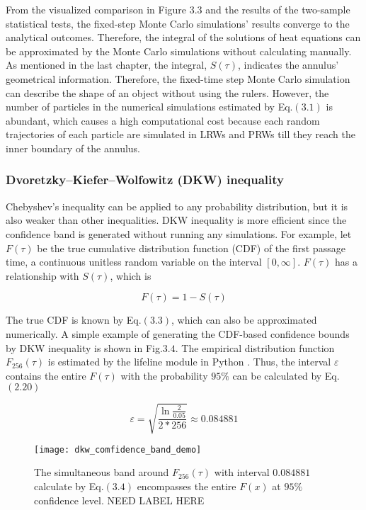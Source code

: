 From the visualized comparison in Figure $3.3$ and the results of the
two-sample statistical tests, the fixed-step Monte Carlo simulations'
results converge to the analytical outcomes. Therefore, the integral
of the solutions of heat equations can be approximated by the Monte
Carlo simulations without calculating manually. As mentioned in the
last chapter, the integral, $S(\tau)$, indicates the annulus'
geometrical information. Therefore, the fixed-time step Monte Carlo
simulation can describe the shape of an object without using the
rulers. However, the number of particles in the numerical simulations
estimated by Eq.$(3.1)$ is abundant, which causes a high computational
cost because each random trajectories of each particle are simulated
in LRWs and PRWs till they reach the inner boundary of the annulus. 


\subsubsection{Dvoretzky–Kiefer–Wolfowitz (DKW) inequality}

Chebyshev's inequality can be applied to any probability distribution,
but it is also weaker than other inequalities. DKW inequality is more
efficient since the confidence band is generated without running any
simulations. For example, let $F(\tau)$ be the true cumulative
distribution function (CDF) of the first passage time, a continuous unitless
random variable on the interval $[0, \infty]$. $F(\tau)$ has a
relationship with $S(\tau)$, which is

\begin{equation}
  F(\tau) = 1 - S(\tau)
\end{equation}

The true CDF is known by Eq.$(3.3)$, which can also be approximated
numerically. A simple example of generating the CDF-based confidence
bounds by DKW inequality is shown in Fig.$3.4$. The empirical
distribution function $F_{256}(\tau)$ is estimated by the lifeline
module in Python \cite{davidson2019lifelines}. Thus, the interval
$\varepsilon$ contains the entire $F(\tau)$ with the probability
$95\%$ can be calculated by Eq.$(2.20)$

\begin{equation}
  \varepsilon = \sqrt{\frac{\ln{\frac{2}{0.05}}}{2* 256}} \approx 0.084881
\end{equation}

\begin{figure}
  \centering
  \texttt{[image: dkw\_comfidence\_band\_demo]}
  \caption{The simultaneous band around $F_{256}(\tau)$ with interval
    $0.084881$ calculate by Eq.$(3.4)$ encompasses the entire $F(x)$
    at $95\%$ confidence level. NEED LABEL HERE}
\end{figure}



